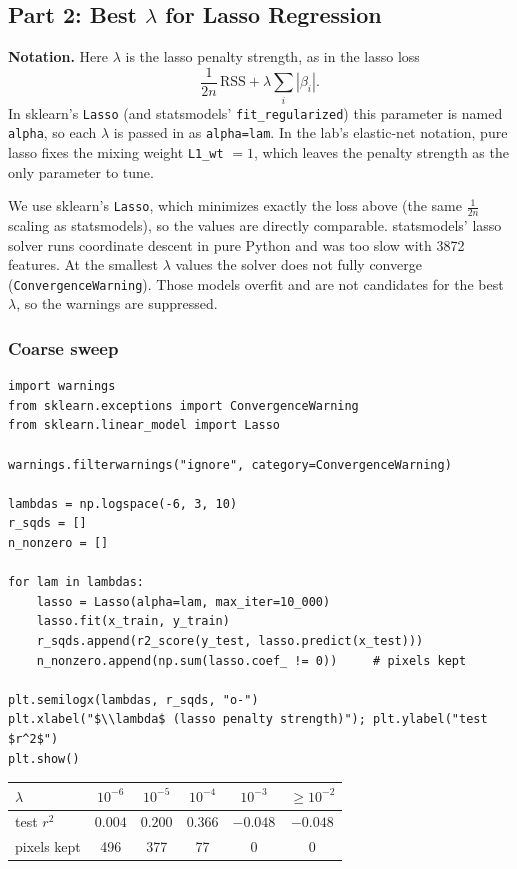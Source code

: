 \documentclass[11pt]{article}
\begin{document}
\clearpage
\subsection*{Part 2: Best $\lambda$ for Lasso Regression}

\textbf{Notation.} Here $\lambda$ is the lasso penalty strength, as in the lasso loss
\[
  \frac{1}{2n}\,\text{RSS} + \lambda\sum_i |\beta_i| .
\]
In sklearn's \texttt{Lasso} (and statsmodels' \texttt{fit\_regularized}) this parameter
is named \texttt{alpha}, so each $\lambda$ is passed in as \texttt{alpha=lam}. In the
lab's elastic-net notation, pure lasso fixes the mixing weight \texttt{L1\_wt} $= 1$, which
leaves the penalty strength as the only parameter to tune.

We use sklearn's \texttt{Lasso}, which minimizes exactly the loss above (the same
$\frac{1}{2n}$ scaling as statsmodels), so the values are directly comparable.
statsmodels' lasso solver runs coordinate descent in pure Python and was too slow with
3872 features. At the smallest $\lambda$ values the solver does not fully converge
(\texttt{ConvergenceWarning}). Those models overfit and are not candidates for the
best $\lambda$, so the warnings are suppressed.

\subsubsection*{Coarse sweep}

\begin{lstlisting}
import warnings
from sklearn.exceptions import ConvergenceWarning
from sklearn.linear_model import Lasso

warnings.filterwarnings("ignore", category=ConvergenceWarning)

lambdas = np.logspace(-6, 3, 10)
r_sqds = []
n_nonzero = []

for lam in lambdas:
    lasso = Lasso(alpha=lam, max_iter=10_000)
    lasso.fit(x_train, y_train)
    r_sqds.append(r2_score(y_test, lasso.predict(x_test)))
    n_nonzero.append(np.sum(lasso.coef_ != 0))     # pixels kept

plt.semilogx(lambdas, r_sqds, "o-")
plt.xlabel("$\\lambda$ (lasso penalty strength)"); plt.ylabel("test $r^2$")
plt.show()
\end{lstlisting}

\begin{center}
\begin{tabular}{lccccc}
\toprule
$\lambda$ & $10^{-6}$ & $10^{-5}$ & $10^{-4}$ & $10^{-3}$ & $\ge 10^{-2}$ \\
\midrule
test $r^2$    & $0.004$ & $0.200$ & $0.366$ & $-0.048$ & $-0.048$ \\
pixels kept   & 496     & 377     & 77      & 0        & 0 \\
\bottomrule
\end{tabular}
\end{center}
\end{document}
